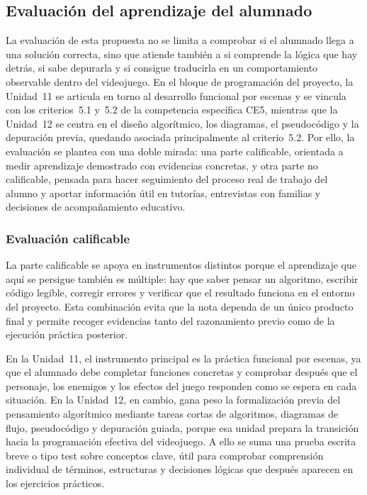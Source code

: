 \documentclass[a4paper,12pt]{article}
\newcounter{subsubsubsection}[subsubsection]
\begin{document}
\subsection{Evaluación del aprendizaje del alumnado}

La evaluación de esta propuesta no se limita a comprobar si el alumnado llega a una solución correcta, sino que atiende también a si comprende la lógica que hay detrás, si sabe depurarla y si consigue traducirla en un comportamiento observable dentro del videojuego. En el bloque de programación del proyecto, la Unidad~11 se articula en torno al desarrollo funcional por escenas y se vincula con los criterios~5.1 y~5.2 de la competencia específica CE5, mientras que la Unidad~12 se centra en el diseño algorítmico, los diagramas, el pseudocódigo y la depuración previa, quedando asociada principalmente al criterio~5.2. Por ello, la evaluación se plantea con una doble mirada: una parte calificable, orientada a medir aprendizaje demostrado con evidencias concretas, y otra parte no calificable, pensada para hacer seguimiento del proceso real de trabajo del alumno y aportar información útil en tutorías, entrevistas con familias y decisiones de acompañamiento educativo.

\subsubsection{Evaluación calificable}

La parte calificable se apoya en instrumentos distintos porque el aprendizaje que aquí se persigue también es múltiple: hay que saber pensar un algoritmo, escribir código legible, corregir errores y verificar que el resultado funciona en el entorno del proyecto. Esta combinación evita que la nota dependa de un único producto final y permite recoger evidencias tanto del razonamiento previo como de la ejecución práctica posterior.


En la Unidad~11, el instrumento principal es la práctica funcional por escenas, ya que el alumnado debe completar funciones concretas y comprobar después que el personaje, los enemigos y los efectos del juego responden como se espera en cada situación. En la Unidad~12, en cambio, gana peso la formalización previa del pensamiento algorítmico mediante tareas cortas de algoritmos, diagramas de flujo, pseudocódigo y depuración guiada, porque esa unidad prepara la transición hacia la programación efectiva del videojuego. A ello se suma una prueba escrita breve o tipo test sobre conceptos clave, útil para comprobar comprensión individual de términos, estructuras y decisiones lógicas que después aparecen en los ejercicios prácticos.
\end{document}
